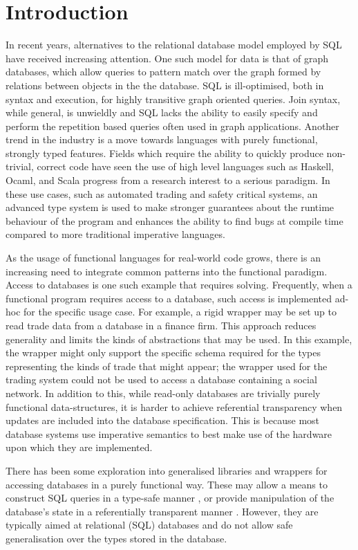 \documentclass[12pt,a4paper,twoside,openright]{report}
\begin{document}
\chapter{Introduction}
In recent years, alternatives to the relational database model employed by SQL have received increasing attention. One such model for data is that of graph databases, which allow queries to pattern match over the graph formed by relations between objects in the the database. SQL is ill-optimised, both in syntax and execution, for highly transitive graph oriented queries. Join syntax, while general, is unwieldly and SQL lacks the ability to easily specify and perform the repetition based queries often used in graph applications. Another trend in the industry is a move towards languages with purely functional, strongly typed features. Fields which require the ability to quickly produce non-trivial, correct code have seen the use of high level languages such as Haskell, Ocaml, and Scala progress from a research interest to a serious paradigm. In these use cases, such as automated trading and safety critical systems, an advanced type system is used to  make stronger guarantees about the runtime behaviour of the program and enhances the ability to find bugs at compile time compared to more traditional imperative languages.
	
	As the usage of functional languages for real-world code grows, there is an increasing need to integrate common patterns into the functional paradigm. Access to databases is one such example that requires solving. Frequently, when a functional program requires access to a database, such access is implemented ad-hoc for the specific usage case. For example, a rigid wrapper may be set up to read trade data from a database in a finance firm. This approach reduces generality and limits the kinds of abstractions that may be used. In this example, the wrapper might only support the specific schema required for the types representing the kinds of trade that might appear; the wrapper used for the trading system could not be used to access a database containing a social network. In addition to this, while read-only databases are trivially purely functional data-structures, it is harder to achieve referential transparency when updates are included into the database specification. This is because most database systems use imperative semantics to best make use of the hardware upon which they are implemented.

	There has been some exploration into generalised libraries and wrappers for accessing databases in a purely functional way. These may allow a means to construct SQL queries in a type-safe manner \cite{HaskellDB}, or provide manipulation of the database’s state in a referentially transparent manner \cite{DBStates}. However, they are typically aimed at relational (SQL) databases and do not allow safe generalisation over the types stored in the database.
\end{document}
